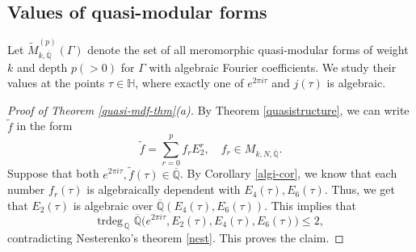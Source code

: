\documentclass[11pt, reqno]{amsart}
\begin{document}
\subsection{Values of quasi-modular forms}
Let $\widetilde{M}_{k,\overline{\mathbb{Q}}}^{(p)}(\Gamma)$ denote the set of all meromorphic quasi-modular forms of weight $k$ and depth $p(>0)$ for $\Gamma$ with algebraic Fourier coefficients. We study their values at the points $\tau\in\mathbb{H}$, where exactly one of $e^{2\pi i\tau}$ and $j(\tau)$ is algebraic.\\

\begin{proof}[Proof of Theorem \ref{quasi-mdf-thm}(a)]
By Theorem \ref{quasistructure}, we can write $\widetilde{f}$ in the form $$\widetilde{f}=\sum_{r=0}^p f_r E_2^r,\quad f_r\in M_{k,N,\overline{\mathbb{Q}}}.$$ 
Suppose that both $e^{2\pi i\tau}, \widetilde f(\tau)\in \overline{\mathbb{Q}}$. By Corollary \ref{algi-cor}, we know that each number $f_r(\tau)$ is algebraically dependent with $E_4(\tau), E_6(\tau)$. Thus, we get that $E_2(\tau)$ is algebraic over $\overline{\mathbb{Q}}(E_4(\tau), E_6(\tau))$. This implies that
\begin{equation*}
    \text{trdeg}_{\,\mathbb{Q}} \, \,\overline{\mathbb{Q}} \bigg( e^{2 \pi i \tau}, E_2(\tau), E_4(\tau), E_6(\tau) \bigg) \leq 2,
\end{equation*}
contradicting Nesterenko's theorem \ref{nest}. This proves the claim.
\end{proof}
\end{document}
